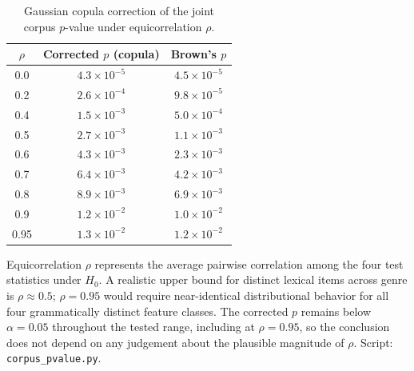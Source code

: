 \documentclass[11pt,a4paper]{article}
\begin{document}
\begin{table}[h]
\centering
\begin{threeparttable}
  \caption{Gaussian copula correction of the joint corpus $p$-value under
    equicorrelation $\rho$.}\label{tab:copula}
\begin{tabular}{@{}ccc@{}}
\toprule
$\rho$ & Corrected $p$ (copula) & Brown's $p$ \\
\midrule
0.0  & $4.3\times10^{-5}$ & $4.5\times10^{-5}$ \\
0.2  & $2.6\times10^{-4}$ & $9.8\times10^{-5}$ \\
0.4  & $1.5\times10^{-3}$ & $5.0\times10^{-4}$ \\
0.5  & $2.7\times10^{-3}$ & $1.1\times10^{-3}$ \\
0.6  & $4.3\times10^{-3}$ & $2.3\times10^{-3}$ \\
0.7  & $6.4\times10^{-3}$ & $4.2\times10^{-3}$ \\
0.8  & $8.9\times10^{-3}$ & $6.9\times10^{-3}$ \\
0.9  & $1.2\times10^{-2}$ & $1.0\times10^{-2}$ \\
0.95 & $1.3\times10^{-2}$ & $1.2\times10^{-2}$ \\
\bottomrule
\end{tabular}
  \begin{tablenotes}
    \footnotesize
    \item Equicorrelation $\rho$ represents the average pairwise
    correlation among the four test statistics under $H_0$. A realistic upper
    bound for distinct lexical items across genre is $\rho \approx 0.5$;
    $\rho = 0.95$ would require near-identical distributional behavior for
    all four grammatically distinct feature classes. The corrected $p$ remains
    below $\alpha = 0.05$ throughout the tested range, including at
    $\rho = 0.95$, so the conclusion does not depend on any judgement about
    the plausible magnitude of $\rho$.
    Script: \texttt{corpus\_pvalue.py}.
  \end{tablenotes}
\end{threeparttable}
\end{table}
\end{document}
